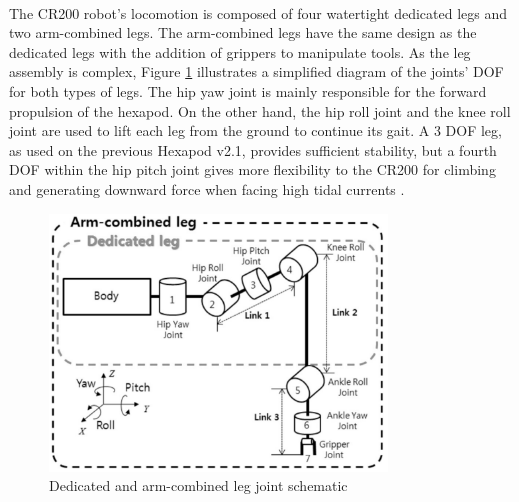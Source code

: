  \mbox{}\\

The CR200 robot's locomotion is composed of four watertight dedicated legs and two arm-combined legs. The arm-combined legs have the same design as the dedicated legs with the addition of grippers to manipulate tools. As the leg assembly is complex, Figure \ref{fig:crabster_leg_dof_img} illustrates a simplified diagram of the joints' DOF for both types of legs. The hip yaw joint is mainly responsible for the forward propulsion of the hexapod. On the other hand, the hip roll joint and the knee roll joint are used to lift each leg from the ground to continue its gait. A 3 DOF leg, as used on the previous Hexapod v2.1, provides sufficient stability, but a fourth DOF within the hip pitch joint gives more flexibility to the CR200 for climbing and generating downward force when facing high tidal currents \cite{shim_development_2016}.

\begin{figure}[H]
    \centering
    \includegraphics[width=0.8\textwidth]{Sections/LiteratureReview/img/Crabster/crabster_leg_dof.jpg}
    \caption{Dedicated and arm-combined leg joint schematic \cite{shim_development_2016}}
    \label{fig:crabster_leg_dof_img}
\end{figure}

